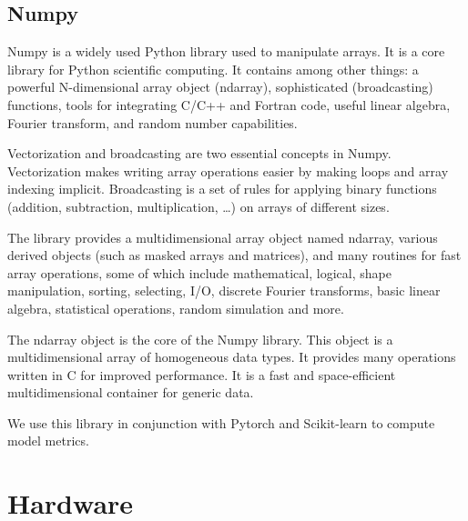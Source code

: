     \subsection{Numpy}
    Numpy is a widely used Python library used to manipulate arrays. It is a core library for Python scientific computing. It contains among other things: a powerful N-dimensional array object (ndarray), sophisticated (broadcasting) functions, tools for integrating C/C++ and Fortran code, useful linear algebra, Fourier transform, and random number capabilities.
        
    Vectorization and broadcasting are two essential concepts in Numpy. Vectorization makes writing array operations easier by making loops and array indexing implicit. Broadcasting is a set of rules for applying binary functions (addition, subtraction, multiplication, \dots) on arrays of different sizes.
    
    The library provides a multidimensional array object named ndarray, various derived objects (such as masked arrays and matrices), and many routines for fast array operations, some of which include mathematical, logical, shape manipulation, sorting, selecting, I/O, discrete Fourier transforms, basic linear algebra, statistical operations, random simulation and more.

    The ndarray object is the core of the Numpy library. This object is a multidimensional array of homogeneous data types. It provides many operations written in C for improved performance. It is a fast and space-efficient multidimensional container for generic data.
    
    We use this library in conjunction with Pytorch and Scikit-learn to compute model metrics.
    
    \section{Hardware}
